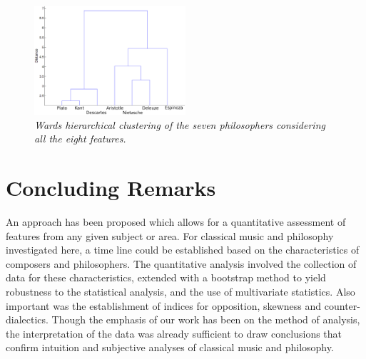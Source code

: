 \documentclass[
 aip,
 jmp,
 amsmath,amssymb,
 reprint,
]{revtex4-1}
\begin{document}
\begin{figure}
        \begin{center}
                \includegraphics[width=0.5\textwidth]{Dendrogram_.eps}
        \end{center}
        \caption{\it Wards hierarchical clustering of the seven
          philosophers considering all the eight features.}
        \label{fig:dendrogramphi}
\end{figure}

\section{Concluding Remarks}

An approach has been proposed which allows for a quantitative
assessment of features from any given subject or area. For classical
music and philosophy investigated here, a time line could be
established based on the characteristics of composers and
philosophers. The quantitative analysis involved the collection of
data for these characteristics, extended with a bootstrap method to
yield robustness to the statistical analysis, and the use of
multivariate statistics. Also important was the establishment of
indices for opposition, skewness and counter-dialectics. Though the
emphasis of our work has been on the method of analysis, the
interpretation of the data was already sufficient to draw conclusions
that confirm intuition and subjective analyses of classical music and
philosophy.
\end{document}
